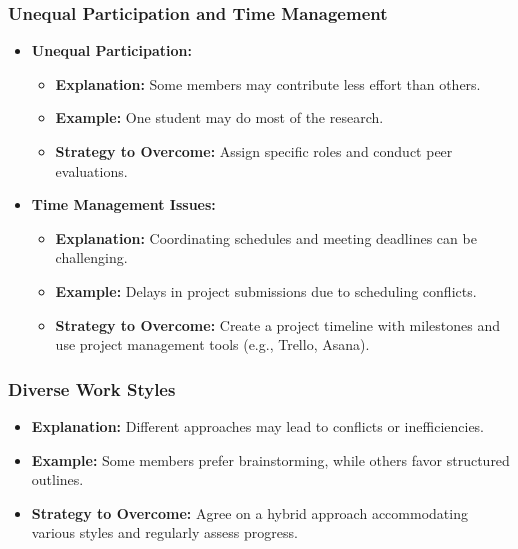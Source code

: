 \documentclass{beamer}
\begin{document}
\begin{frame}[fragile]
    \frametitle{Unequal Participation and Time Management}
    \begin{itemize}
        \item \textbf{Unequal Participation:}
        \begin{itemize}
            \item \textbf{Explanation:} Some members may contribute less effort than others.
            \item \textbf{Example:} One student may do most of the research.
            \item \textbf{Strategy to Overcome:} Assign specific roles and conduct peer evaluations.
        \end{itemize}
        \item \textbf{Time Management Issues:}
        \begin{itemize}
            \item \textbf{Explanation:} Coordinating schedules and meeting deadlines can be challenging.
            \item \textbf{Example:} Delays in project submissions due to scheduling conflicts.
            \item \textbf{Strategy to Overcome:} Create a project timeline with milestones and use project management tools (e.g., Trello, Asana).
        \end{itemize}
    \end{itemize}
\end{frame}

\begin{frame}[fragile]
    \frametitle{Diverse Work Styles}
    \begin{itemize}
        \item \textbf{Explanation:} Different approaches may lead to conflicts or inefficiencies.
        \item \textbf{Example:} Some members prefer brainstorming, while others favor structured outlines.
        \item \textbf{Strategy to Overcome:} Agree on a hybrid approach accommodating various styles and regularly assess progress.
    \end{itemize}
\end{frame}
\end{document}
